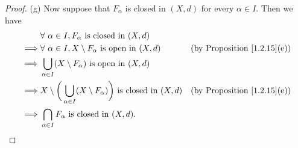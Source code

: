 \begin{proof}{(g)}
    Now suppose that \(F_\alpha\) is closed in \((X, d)\) for every \(\alpha \in I\).
    Then we have
    \begin{align*}
                 & \forall\ \alpha \in I, F_\alpha \text{ is closed in } (X, d)                                                                                 \\
        \implies & \forall\ \alpha \in I, X \setminus F_\alpha \text{ is open in } (X, d)                             & \text{(by Proposition \ref{1.2.15}(e))} \\
        \implies & \bigcup_{\alpha \in I} (X \setminus F_\alpha) \text{ is open in } (X, d)                                                                     \\
        \implies & X \setminus \bigg(\bigcup_{\alpha \in I} (X \setminus F_\alpha)\bigg) \text{ is closed in } (X, d) & \text{(by Proposition \ref{1.2.15}(e))} \\
        \implies & \bigcap_{\alpha \in I} F_\alpha \text{ is closed in } (X, d).
    \end{align*}
\end{proof}

